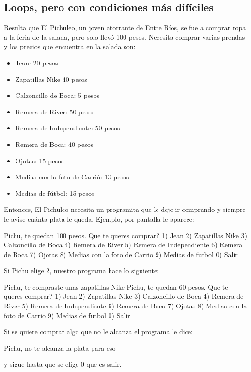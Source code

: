 \subsection{Loops, pero con condiciones más difíciles}

Resulta que El Pichuleo, un joven atorrante de Entre Ríos, se fue a comprar ropa a la feria de la salada, pero solo llevó 100 pesos. Necesita comprar varias prendas y los precios que encuentra en la salada son:
\begin{itemize}
  \item Jean: 20 pesos
  \item Zapatillas Nike 40 pesos
  \item Calzoncillo de Boca: 5 pesos
  \item Remera de River: 50 pesos
  \item Remera de Independiente: 50 pesos
  \item Remera de Boca: 40 pesos
  \item Ojotas: 15 pesos
  \item Medias con la foto de Carrió: 13 pesos
  \item Medias de fútbol: 15 pesos
\end{itemize}

Entonces, El Pichuleo necesita un programita que le deje ir comprando y siempre le avise cuánta plata le queda. Ejemplo, por pantalla le aparece:

\begin{console-output}
Pichu, te quedan 100 pesos. Que te queres comprar?
1) Jean
2) Zapatillas Nike
3) Calzoncillo de Boca
4) Remera de River
5) Remera de Independiente
6) Remera de Boca
7) Ojotas 
8) Medias con la foto de Carrio
9) Medias de futbol
0) Salir
\end{console-output}
Si Pichu elige 2, nuestro programa hace lo siguiente:
\begin{console-output}
Pichu, te compraste unas zapatillas Nike
Pichu, te quedan 60 pesos. Que te queres comprar?
1) Jean
2) Zapatillas Nike
3) Calzoncillo de Boca
4) Remera de River
5) Remera de Independiente
6) Remera de Boca
7) Ojotas 
8) Medias con la foto de Carrio
9) Medias de futbol
0) Salir
\end{console-output}

Si se quiere comprar algo que no le alcanza el programa le dice:
\begin{console-output}
Pichu, no te alcanza la plata para eso
\end{console-output}
y sigue hasta que se elige 0 que es salir.